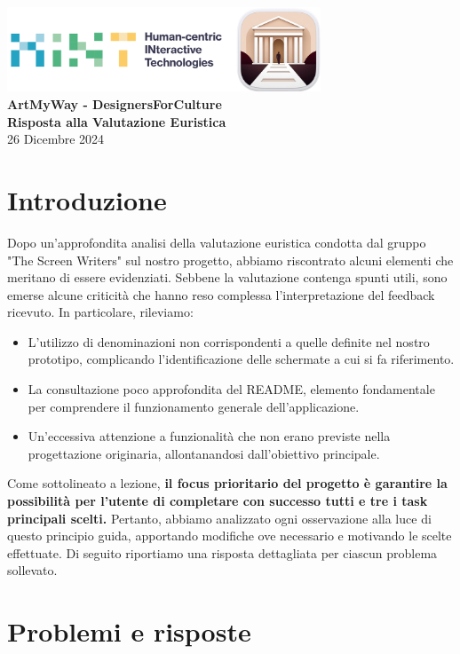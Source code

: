 \documentclass{article}
\begin{document}
\begin{center}
    \includegraphics[width=0.7\textwidth]{../assets/HINT+Logo.png} \\[1em]
    {\LARGE \textbf{ArtMyWay - DesignersForCulture}} \\[0.5em]
    {\Large \textbf{Risposta alla Valutazione Euristica}} \\[1.5em]
    {\large 26 Dicembre 2024}
\end{center}

\section*{Introduzione}

Dopo un'approfondita analisi della valutazione euristica condotta dal gruppo "The Screen Writers" sul nostro progetto, abbiamo riscontrato alcuni elementi che meritano di essere evidenziati. Sebbene la valutazione contenga spunti utili, sono emerse alcune criticità che hanno reso complessa l’interpretazione del feedback ricevuto. In particolare, rileviamo:
\begin{itemize}
    \item L’utilizzo di denominazioni non corrispondenti a quelle definite nel nostro prototipo, complicando l'identificazione delle schermate a cui si fa riferimento.
    \item La consultazione poco approfondita del README, elemento fondamentale per comprendere il funzionamento generale dell’applicazione.
    \item Un'eccessiva attenzione a funzionalità che non erano previste nella progettazione originaria, allontanandosi dall’obiettivo principale.
\end{itemize}

Come sottolineato a lezione, \textbf{il focus prioritario del progetto è garantire la possibilità per l’utente di completare con successo tutti e tre i task principali scelti.} Pertanto, abbiamo analizzato ogni osservazione alla luce di questo principio guida, apportando modifiche ove necessario e motivando le scelte effettuate. Di seguito riportiamo una risposta dettagliata per ciascun problema sollevato.

\section*{Problemi e risposte}
\end{document}
